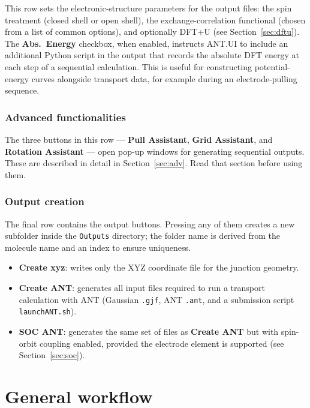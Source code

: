 \documentclass[12pt]{article}
\begin{document}
This row sets the electronic-structure parameters for the output files: the spin treatment (closed shell or open shell), the exchange-correlation functional (chosen from a list of common options), and optionally DFT+U (see Section~\ref{sec:dftu}). The \textbf{Abs.\ Energy} checkbox, when enabled, instructs ANT.UI to include an additional Python script in the output that records the absolute DFT energy at each step of a sequential calculation. This is useful for constructing potential-energy curves alongside transport data, for example during an electrode-pulling sequence.

\subsubsection*{Advanced functionalities}

The three buttons in this row — \textbf{Pull Assistant}, \textbf{Grid Assistant}, and \textbf{Rotation Assistant} — open pop-up windows for generating sequential outputs. These are described in detail in Section~\ref{sec:adv}. Read that section before using them.

\subsubsection*{Output creation}

The final row contains the output buttons. Pressing any of them creates a new subfolder inside the \texttt{Outputs} directory; the folder name is derived from the molecule name and an index to ensure uniqueness.

\begin{itemize}
    \item \textbf{Create xyz}: writes only the XYZ coordinate file for the junction geometry.
    \item \textbf{Create ANT}: generates all input files required to run a transport calculation with ANT (Gaussian \texttt{.gjf}, ANT \texttt{.ant}, and a submission script \texttt{launchANT.sh}).
    \item \textbf{SOC ANT}: generates the same set of files as \textbf{Create ANT} but with spin-orbit coupling enabled, provided the electrode element is supported (see Section~\ref{sec:soc}).
\end{itemize}

\section{General workflow}
\end{document}
